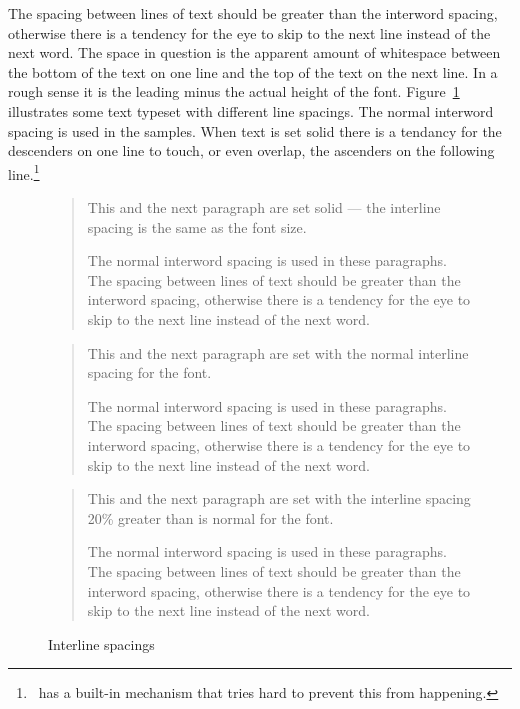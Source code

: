 \documentclass[10pt,letterpaper,extrafontsizes]{memoir}
\begin{document}
    The spacing between lines of text 
should be greater than the interword
spacing, otherwise there is a tendency for the eye to skip to the
next line instead of the next word. The space in question is the apparent
amount of whitespace between the bottom of the text on one line and the top
of the text on the next line. In a rough sense it is the leading minus the
actual height of the font.
Figure~\ref{fig:interline} illustrates
some text typeset with different line spacings. The normal interword
spacing is used in the samples. When text is set solid there is a tendancy
for the descenders on one line to touch, or even overlap, the ascenders on the 
following line.\footnote{\tx\ has a built-in mechanism that tries hard to 
prevent this from happening.}

\begin{figure}
\centering
\begin{minipage}{\textwidth}
\mbox{}\hrulefill\mbox{}
\normalfont\setlength{\unitlength}{\baselineskip}
\begin{quotation}
\normalfont\setlength{\baselineskip}{1em}
    This and the next paragraph are set solid --- the interline spacing 
is the same as the font size. \par
The normal interword spacing is used in these paragraphs.
    The spacing between lines of text should be greater than the interword
spacing, otherwise there is a tendency for the eye to skip to the
next line instead of the next word. \par
\end{quotation}
\begin{quotation}
\normalfont\setlength{\baselineskip}{\unitlength}
    This and the next paragraph are set with the normal interline spacing 
for the font. \par
The normal interword spacing is used in these paragraphs.
    The spacing between lines of text should be greater than the interword
spacing, otherwise there is a tendency for the eye to skip to the
next line instead of the next word. \par
\end{quotation}
\begin{quotation}
\normalfont\setlength{\parskip}{0.2\baselineskip}\setlength{\baselineskip}{1.2\unitlength}
    This and the next paragraph are set with the interline spacing 20\% 
greater than is normal for the font. \par
The normal interword spacing is used in these paragraphs.
    The spacing between lines of text should be greater than the interword
spacing, otherwise there is a tendency for the eye to skip to the
next line instead of the next word. \par
\end{quotation}
\mbox{}\hrulefill\mbox{}
\end{minipage}
\normalfont\setlength{\baselineskip}{\unitlength}
\setlength{\unitlength}{1pt}
\caption{Interline spacings}\label{fig:interline}
\end{figure}
\setlength{\unitlength}{1pt}
\end{document}
